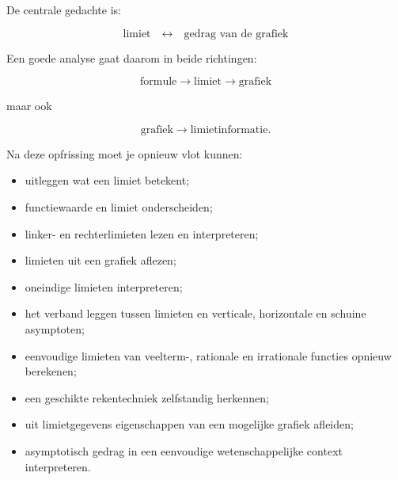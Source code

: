 \documentclass{ximera}
\begin{document}
De centrale gedachte is:

\[
\boxed{
\text{limiet}
\quad\longleftrightarrow\quad
\text{gedrag van de grafiek}
}
\]

Een goede analyse gaat daarom in beide richtingen:

\[
\text{formule}
\longrightarrow
\text{limiet}
\longrightarrow
\text{grafiek}
\]

maar ook

\[
\text{grafiek}
\longrightarrow
\text{limietinformatie}.
\]




Na deze opfrissing moet je opnieuw vlot kunnen:

\begin{itemize}

  \item uitleggen wat een limiet betekent;

  \item functiewaarde en limiet onderscheiden;

  \item linker- en rechterlimieten lezen en interpreteren;

  \item limieten uit een grafiek aflezen;

  \item oneindige limieten interpreteren;

  \item het verband leggen tussen limieten en verticale,
        horizontale en schuine asymptoten;

  \item eenvoudige limieten van veelterm-, rationale en irrationale
        functies opnieuw berekenen;

  \item een geschikte rekentechniek zelfstandig herkennen;

  \item uit limietgegevens eigenschappen van een mogelijke grafiek
        afleiden;

  \item asymptotisch gedrag in een eenvoudige wetenschappelijke
        context interpreteren.

\end{itemize}
\end{document}
